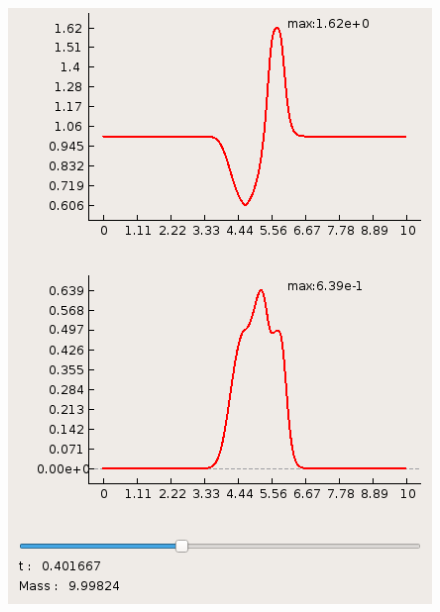 \documentclass[a4paper, 11pt]{article}
\begin{document}
\begin{figure}[H]
	\begin{minipage}[h] {0.49\linewidth}
		\includegraphics[width=1\linewidth]{p2/p2_t=0,4.png}
	\end{minipage}
		\begin{minipage}[h] {0.49\linewidth}

\end{minipage}
\end{figure}
\end{document}
